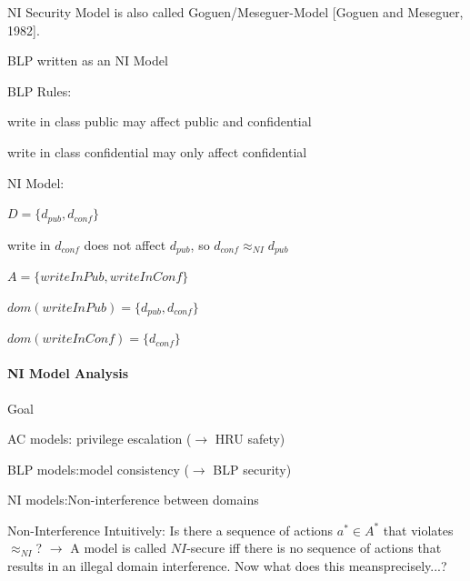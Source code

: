 \documentclass[a4paper]{article}
\begin{document}
\begin{multicols}{3}
    NI Security Model is also called Goguen/Meseguer-Model [Goguen and Meseguer, 1982].

    BLP written as an NI Model
    \begin{itemize*}
        \item BLP Rules:
        \begin{itemize*}
            \item write in class public may affect public and confidential
            \item write in class confidential may only affect confidential
        \end{itemize*}
        \item NI Model:
        \begin{itemize*}
            \item $D=\{d_{pub},d_{conf}\}$
            \item write in $d_{conf}$ does not affect $d_{pub}$, so $d_{conf} \approx_{NI} d_{pub}$
            \item $A=\{writeInPub, writeInConf\}$
            \item $dom(writeInPub)=\{d_{pub},d_{conf}\}$
            \item $dom(writeInConf)=\{d_{conf}\}$
        \end{itemize*}
    \end{itemize*}

    \paragraph{NI Model Analysis}
    Goal
    \begin{itemize*}
        \item AC models: privilege escalation ($\rightarrow$ HRU safety)
        \item BLP models:model consistency ($\rightarrow$ BLP security)
        \item NI models:Non-interference between domains
    \end{itemize*}

    Non-Interference Intuitively:
    Is there a sequence of actions $a^*\in A^*$ that violates $\approx_{NI}$? $\rightarrow$ A model is called $NI$-secure iff there is no sequence of actions that results in an illegal domain interference. Now what does this meansprecisely...?


\end{multicols}
\end{document}
